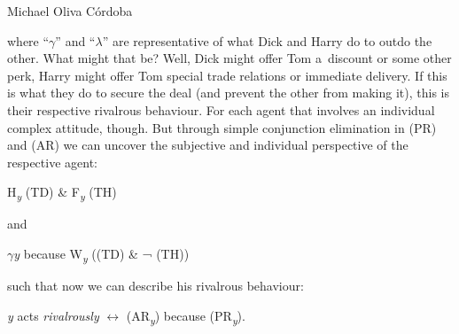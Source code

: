 \begin{artengenv}{Michael Oliva Córdoba}
%
%
%

\noindent where ``\textit{$\gamma $}'' and ``\textit{$\lambda $}'' are representative of what Dick and Harry do to outdo the other. What might that be? Well, Dick might offer Tom a~discount or some other perk, Harry might offer Tom special trade relations or immediate delivery. If this is what they do to secure the deal (and prevent the other from making it), this is their respective rivalrous behaviour. For each agent that involves an individual complex attitude, though. But through simple conjunction elimination in (PR) and (AR) we can uncover the subjective and individual perspective of the respective agent:
\vspace{-.09cm}
\begin{description}[font=\normalfont, labelindent=0pt, leftmargin=!, labelwidth=1cm]
  \item[(PR\textit{\textsubscript{y}})]  H\textit{\textsubscript{y}} (TD) \& F\textit{\textsubscript{y}} (TH)
\end{description}
\vspace{-.09cm}


%
%
%
%

\noindent and
\vspace{-.09cm}
\begin{description}[font=\normalfont, labelindent=0pt, leftmargin=!, labelwidth=1cm]
  \item[(AR\textit{\textsubscript{y}})]  \textit{$\gamma $y} because W\textit{\textsubscript{y}} ((TD) \& ¬ (TH))
\end{description}
\vspace{-.09cm}


%
%
%
%

\noindent such that now we can describe his rivalrous behaviour:
\vspace{-.09cm}
\begin{description}[font=\normalfont, labelindent=0pt, leftmargin=!, labelwidth=1cm]
  \item[(R)]  \textit{y} acts \textit{rivalrously} $\leftrightarrow$ (AR\textit{\textsubscript{y}}) because (PR\textit{\textsubscript{y}}).
\end{description}
\vspace{-.09cm}



\end{artengenv}
